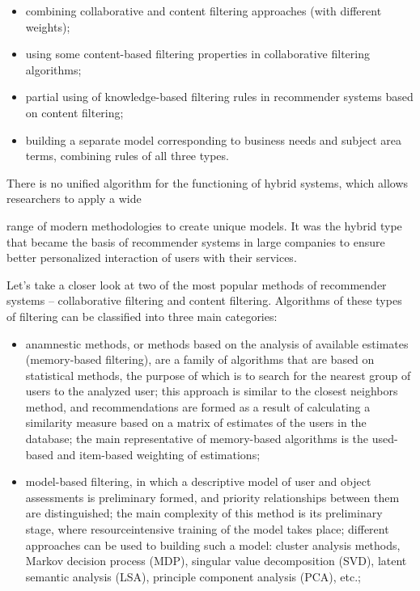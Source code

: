 \documentclass[10pt, a4paper]{article}
\begin{document}
\begin{multicols}{2}
\vspace{-1.2em}
\begin{itemize}[itemsep=0pt, parsep=0pt]
\item combining collaborative and content filtering approaches (with different weights);
\item using some content-based filtering properties in
collaborative filtering algorithms;
\item partial using of knowledge-based filtering rules in recommender systems based on content filtering;
\item building a separate model corresponding to business needs and subject area terms, combining rules of all three types.
\end{itemize}
\vspace{-1em}

There is no unified algorithm for the functioning of
hybrid systems, which allows researchers to apply a wide

\columnbreak

\noindent range of modern methodologies to create unique models. It
was the hybrid type that became the basis of recommender
systems in large companies to ensure better personalized
interaction of users with their services.\par
\hspace{-0.8em}
Let’s take a closer look at two of the most popular
methods of recommender systems – collaborative filtering
and content filtering. Algorithms of these types of filtering
can be classified into three main categories:

\vspace{-0.95em}
\begin{itemize}[itemsep=0pt, parsep=0pt]
\item anamnestic methods, or methods based on the
analysis of available estimates (memory-based
filtering), are a family of algorithms that are based
on statistical methods, the purpose of which is to
search for the nearest group of users to the analyzed
user; this approach is similar to the closest neighbors
method, and recommendations are formed as a result
of calculating a similarity measure based on a matrix
of estimates of the users in the database; the main
representative of memory-based algorithms is the
used-based and item-based weighting of estimations;

\item model-based filtering, in which a descriptive model of user and object assessments is preliminary
formed, and priority relationships between them
are distinguished; the main complexity of this
method is its preliminary stage, where resourceintensive training of the model takes place; different
approaches can be used to building such a
model: cluster analysis methods, Markov decision
process (MDP), singular value decomposition (SVD),
latent semantic analysis (LSA), principle component
analysis (PCA), etc.;


\end{itemize}
\end{multicols}
\end{document}
